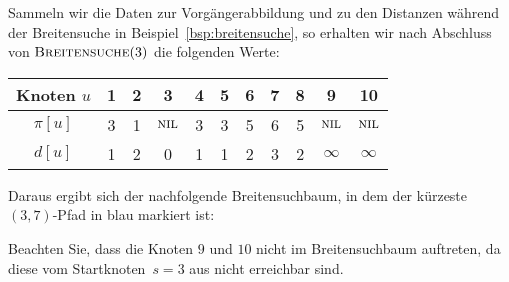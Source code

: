 \begin{bsp}
Sammeln wir die Daten zur Vorgängerabbildung und zu den Distanzen während der Breitensuche in Beispiel~\ref{bsp:breitensuche}, so erhalten wir nach Abschluss von $\mathop{\text{\textsc{Breitensuche}}}(3)$ die folgenden Werte:

\begin{table}[H]
\centering
\begin{tabular}{|c|c|c|c|c|c|c|c|c|c|c|}
\hline
\textbf{Knoten $u$}        & \textbf{1} & \textbf{2} & \textbf{3} & \textbf{4} & \textbf{5} & \textbf{6} & \textbf{7} & \textbf{8} & \textbf{9} & \textbf{10} \\ \hline
\textbf{$\pi[u]$}    & 3          & 1          & $\mathop{\text{\textsc{nil}}}$          & 3          & 3          & 5          & 6         & 5         & $\mathop{\text{\textsc{nil}}}$         & $\mathop{\text{\textsc{nil}}}$          \\ \hline
\textbf{$d[u]$} & 1          & 2          & 0         & 1          & 1         & 2         & 3         & 2         & $\infty$         & $\infty$          \\ \hline
\end{tabular}
\end{table}

Daraus ergibt sich der nachfolgende Breitensuchbaum, in dem der kürzeste $(3,7)$-Pfad in blau markiert ist:

\begin{center} 
\end{center} 

Beachten Sie, dass die Knoten $9$ und $10$ nicht im Breitensuchbaum auftreten, da diese vom Startknoten~$s=3$ aus nicht erreichbar sind.
\end{bsp}



